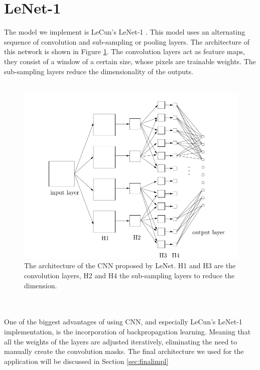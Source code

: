 \documentclass[a4paper,onecolumn]{report}
\begin{document}
\section{LeNet-1}
The model we implement is LeCun's LeNet-1 \cite{lenet}. This model uses an alternating sequence of convolution and sub-sampling or pooling layers. The architecture of this network is shown in Figure \ref{fig:Architecture}. The convolution layers act as feature maps, they consist of a window of a certain size, whose pixels are trainable weights. The sub-sampling layers reduce the dimensionality of the outputs. 
\\\\
\begin{figure}[h!]
    \centering
    \includegraphics[scale=0.4]{./images/Architecture_CNN.png}
    \caption{The architecture of the CNN proposed by LeNet. H1 and H3 are the convolution layers, H2 and H4 the sub-sampling layers to reduce the dimension. }
	\label{fig:Architecture}
\end{figure}
\\\\
One of the biggest advantages of using CNN, and especially LeCun's LeNet-1 implementation, is the incorporation of backpropagation learning. Meaning that all the weights of the layers are adjusted iteratively, eliminating the need to manually create the convolution masks. The final architecture we used for the application will be discussed in Section \ref{sec:finalimpl}
\end{document}
